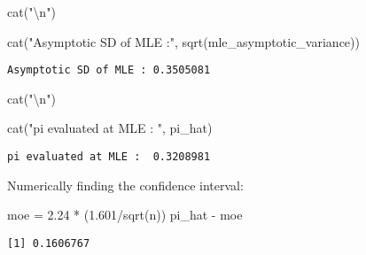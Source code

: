 \documentclass[
  letterpaper,
  DIV=11,
  numbers=noendperiod]{scrartcl}
\newenvironment{Shaded}{\begin{snugshade}}{\end{snugshade}}
\newcommand{\FloatTok}[1]{\textcolor[rgb]{0.68,0.00,0.00}{#1}}
\newcommand{\FunctionTok}[1]{\textcolor[rgb]{0.28,0.35,0.67}{#1}}
\newcommand{\NormalTok}[1]{\textcolor[rgb]{0.00,0.23,0.31}{#1}}
\newcommand{\OtherTok}[1]{\textcolor[rgb]{0.00,0.23,0.31}{#1}}
\newcommand{\SpecialCharTok}[1]{\textcolor[rgb]{0.37,0.37,0.37}{#1}}
\newcommand{\StringTok}[1]{\textcolor[rgb]{0.13,0.47,0.30}{#1}}
\begin{document}
\begin{Shaded}
\begin{Highlighting}[]
\FunctionTok{cat}\NormalTok{(}\StringTok{"}\SpecialCharTok{\textbackslash{}n}\StringTok{"}\NormalTok{)}
\end{Highlighting}
\end{Shaded}

\begin{Shaded}
\begin{Highlighting}[]
\FunctionTok{cat}\NormalTok{(}\StringTok{"Asymptotic SD of MLE :"}\NormalTok{, }\FunctionTok{sqrt}\NormalTok{(mle\_asymptotic\_variance))}
\end{Highlighting}
\end{Shaded}

\begin{verbatim}
Asymptotic SD of MLE : 0.3505081
\end{verbatim}

\begin{Shaded}
\begin{Highlighting}[]
\FunctionTok{cat}\NormalTok{(}\StringTok{"}\SpecialCharTok{\textbackslash{}n}\StringTok{"}\NormalTok{)}
\end{Highlighting}
\end{Shaded}

\begin{Shaded}
\begin{Highlighting}[]
\FunctionTok{cat}\NormalTok{(}\StringTok{"pi evaluated at MLE : "}\NormalTok{, pi\_hat)}
\end{Highlighting}
\end{Shaded}

\begin{verbatim}
pi evaluated at MLE :  0.3208981
\end{verbatim}

Numerically finding the confidence interval:

\begin{Shaded}
\begin{Highlighting}[]
\NormalTok{moe }\OtherTok{=} \FloatTok{2.24} \SpecialCharTok{*}\NormalTok{ (}\FloatTok{1.601}\SpecialCharTok{/}\FunctionTok{sqrt}\NormalTok{(n))}
\NormalTok{pi\_hat }\SpecialCharTok{{-}}\NormalTok{ moe  }
\end{Highlighting}
\end{Shaded}

\begin{verbatim}
[1] 0.1606767
\end{verbatim}
\end{document}
